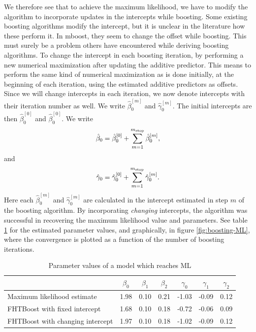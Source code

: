 We therefore see that to achieve the maximum likelihood, we have to modify the algorithm to incorporate updates in the intercepts while boosting.
Some existing boosting algorithms modify the intercept, but it is unclear in the literature how these perform it.
In mboost, they seem to change the offset while boosting.
This must surely be a problem others have encountered while deriving boosting algorithms.
To change the intercept in each boosting iteration, by performing a new numerical maximization after updating the additive predictor.
This means to perform the same kind of numerical maximization as is done initially, at the beginning of each iteration, using the estimated additive predictors as offsets.
Since we will change intercepts in each iteration, we now denote intercepts with their iteration number as well.
We write $\hat{\beta}_{0}^{[m]}$ and $\hat{\gamma}_{0}^{[m]}$.
The initial intercepts are then $\hat{\beta}_{0}^{[0]}$ and $\hat{\beta}_{0}^{[0]}$.
We write
\begin{equation}
    \hat{\beta}_{0}=\hat{\beta}_{0}^{[0]}+\sum_{m=1}^{m_{\text{stop}}}\hat{\beta}_{0}^{[m]},
\end{equation}
and
\begin{equation}
    \hat{\gamma}_{0}=\hat{\gamma}_{0}^{[0]}+\sum_{m=1}^{m_{\text{stop}}}\hat{\gamma}_{0}^{[m]}.
\end{equation}
Here each $\hat{\beta}_{0}^{[m]}$ and $\hat{\gamma}_{0}^{[m]}$ are calculated in the intercept estimated in step $m$ of the boosting algorithm.
By incorporating \textit{changing} intercepts, the algorithm was successful in recovering the maximum likelihood value and parameters.
See table \ref{table:ML} for the estimated parameter values, and graphically, in figure \ref{fig:boosting-ML}, where the convergence is plotted as a function of the number of boosting iterations.
\begin{table}\caption{Parameter values of a model which reaches ML}\label{table:ML}
\centering
\begin{tabular}{lcccccc}
\toprule
    & $\beta_{0}$ & $\beta_{1}$ & $\beta_{2}$ & $\gamma_{0}$ & $\gamma_{1}$ & $\gamma_{2}$ \\
\hline
Maximum likelihood estimate                   &    1.98 &    0.10 &    0.21 &    -1.03 &    -0.09 &     0.12 \\
FHTBoost with fixed intercept                 &    1.68 &    0.10 &    0.18 &    -0.72 &    -0.06 &     0.09 \\
FHTBoost with changing intercept              &    1.97 &    0.10 &    0.18 &    -1.02 &    -0.09 &     0.12 \\
\bottomrule
\end{tabular}
\end{table}
